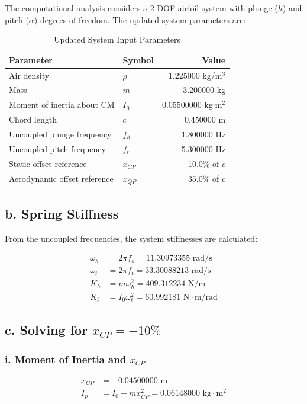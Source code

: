 \documentclass{article}
\begin{document}
The computational analysis considers a 2-DOF airfoil system with plunge ($h$) and pitch ($\alpha$) degrees of freedom. The updated system parameters are:

\begin{table}[H]
\centering
\caption{Updated System Input Parameters}
\begin{tabular}{@{}llr@{}}
\toprule
\textbf{Parameter} & \textbf{Symbol} & \textbf{Value} \\
\midrule
Air density & $\rho$ & 1.225000 kg/m$^3$ \\
Mass & $m$ & 3.200000 kg \\
Moment of inertia about CM & $I_0$ & 0.05500000 kg$\cdot$m$^2$ \\
Chord length & $c$ & 0.450000 m \\
Uncoupled plunge frequency & $f_h$ & 1.800000 Hz \\
Uncoupled pitch frequency & $f_t$ & 5.300000 Hz \\
Static offset reference & $x_{CP}$ & -10.0\% of $c$ \\
Aerodynamic offset reference & $x_{QP}$ & 35.0\% of $c$ \\
\bottomrule
\end{tabular}
\end{table}


\subsection{b. Spring Stiffness}

From the uncoupled frequencies, the system stiffnesses are calculated:

\begin{align}
\omega_h &= 2\pi f_h = 11.30973355 \text{ rad/s} \\
\omega_t &= 2\pi f_t = 33.30088213 \text{ rad/s} \\
K_h &= m \omega_h^2 = 409.312234 \text{ N/m} \\
K_t &= I_0 \omega_t^2 = 60.992181 \text{ N}\cdot\text{m/rad}
\end{align}

\subsection{c. Solving for $x_{CP} = -10\%$}
\subsubsection{i. Moment of Inertia and $x_{CP}$}
\begin{align}
x_{CP} &= -0.04500000 \text{ m} \\
I_p &= I_0 + m x_{CP}^2 = 0.06148000 \text{ kg}\cdot\text{m}^2
\end{align}
\end{document}
